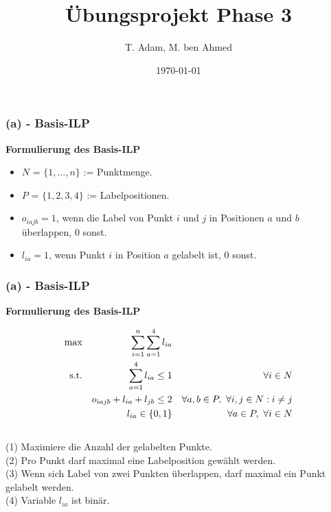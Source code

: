 \documentclass[aspectratio=169]{beamer}
\title[Übungsprojekt Phase 3]{Übungsprojekt Phase 3} %
\author{T. Adam, M. ben Ahmed} %
\institute[UOS] %
{

Universität Osnabrück \\ %

\medskip
\textit{Æ} %


}
\date{\today} %
\begin{document}
\begin{frame}
\titlepage %
\end{frame}





\begin{frame}
	\frametitle{(a) - Basis-ILP}
	\textbf{Formulierung des Basis-ILP}\\
	\begin{itemize}
		\item $N$	= $ \{1,\dotsc,n\}$ := Punktmenge.
		\item $P$ = $ \{1,2,3,4\}$ := Labelpositionen.
		\item $o_{iajb} = 1$, wenn die Label von Punkt $i$ und $j$ in Positionen $a$ und $b$ überlappen, $0$ sonst.
		\item $l_{ia} = 1$, wenn Punkt $i$ in Position $a$ gelabelt ist, 0 sonst.
	\end{itemize}
	\end{frame}


\begin{frame}
	\frametitle{(a) - Basis-ILP}
	\textbf{Formulierung des Basis-ILP}

	\begin{align}
	\max     && \sum_{i = 1}^n \sum_{a = 1}^4 l_{ia} \\
	\text{s.t.}
					&& \sum_{a = 1}^4 l_{ia} \leq 1                    && \forall i \in N\\
					&&   o_{iajb} + l_{ia} + l_{jb} \leq  2        && \forall a,b \in P,\thinspace \thinspace \forall i,j\in N : i \neq j \\
					&&   l_{ia} \in \{0,1\}                            && \forall a \in P,\thinspace \thinspace \forall i\in N                                      
	\end{align}
	\\
	(1) Maximiere die Anzahl der gelabelten Punkte.\\
	(2) Pro Punkt darf maximal eine Labelposition gewählt werden.\\
	(3) Wenn sich Label von zwei Punkten überlappen, darf maximal ein Punkt gelabelt werden.\\
	(4) Variable $l_{ia}$ ist binär.
	\end{frame}
\end{document}

